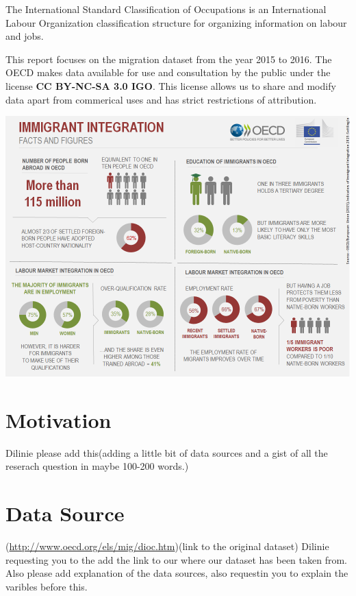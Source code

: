 \documentclass[11pt,a4paper,]{article}
\let\origfigure\figure
\let\endorigfigure\endfigure
\renewenvironment{figure}[1][2] {
    \expandafter\origfigure\expandafter[H]
} {
    \endorigfigure
}%
\begin{document}
The International Standard Classification of Occupations is an International Labour Organization classification structure for organizing information on labour and jobs.

This report focuses on the migration dataset from the year 2015 to 2016. The OECD makes data available for use and consultation by the public under the license \textbf{CC BY-NC-SA 3.0 IGO}. This license allows us to share and modify data apart from commerical uses and has strict restrictions of attribution.

\begin{figure}
\centering
\includegraphics{data/image.png}
\caption{Migration Facts and Figures}
\end{figure}

\section*{Motivation}

Dilinie please add this(adding a little bit of data sources and a gist of all the reserach question in maybe 100-200 words.)

\section*{Data Source}

(\url{http://www.oecd.org/els/mig/dioc.htm})(link to the original dataset)
Dilinie requesting you to the add the link to our where our dataset has been taken from. Also please add explanation of the data sources, also requestin you to explain the varibles before this.
\end{document}

